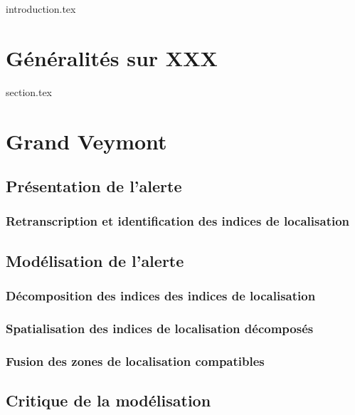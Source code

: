 
\chaptertoc{}

{introduction.tex}

\section{Généralités sur XXX}
\label{sec:9-1}
{section.tex}

\section{Grand Veymont}
\label{sec:9-1}

\subsection{Présentation de l'alerte}
\label{subsec:9-1-1}

\subsubsection{Retranscription et identification des indices de localisation}
\label{subsec:9-1-1-1}

\subsection{Modélisation de l'alerte}
\label{subsec:9-1-2}


\subsubsection{Décomposition des indices des indices de localisation}
\label{subsec:9-1-2-2}

\subsubsection{Spatialisation des indices de localisation décomposés}
\label{subsec:9-1-2-3}

\subsubsection{Fusion des zones de localisation compatibles}
\label{subsec:9-1-2-4}

\subsection{Critique de la modélisation}
\label{subsec:9-1-3}


